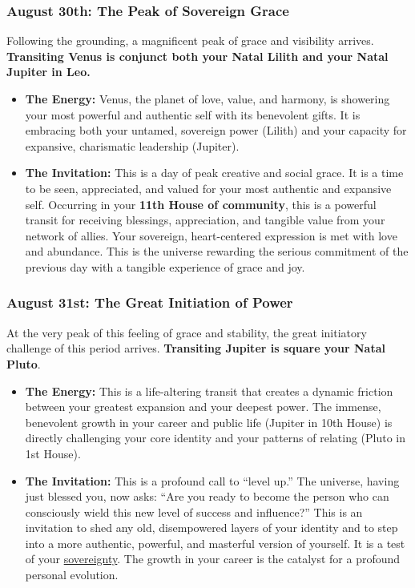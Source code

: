 \documentclass{article}
\begin{document}
\subsubsection*{August 30th: The Peak of Sovereign Grace}\label{august-30th-the-peak-of-sovereign-grace}

Following the grounding, a magnificent peak of grace and visibility arrives. \textbf{Transiting Venus is conjunct both your Natal Lilith and your Natal Jupiter in Leo.}

\begin{itemize}
\item
  \textbf{The Energy:} Venus, the planet of love, value, and harmony, is showering your most powerful and authentic self with its benevolent gifts. It is embracing both your untamed, sovereign power (Lilith) and your capacity for expansive, charismatic leadership (Jupiter).
\item
  \textbf{The Invitation:} This is a day of peak creative and social grace. It is a time to be seen, appreciated, and valued for your most authentic and expansive self. Occurring in your \textbf{11th House of community}, this is a powerful transit for receiving blessings, appreciation, and tangible value from your network of allies. Your sovereign, heart-centered expression is met with love and abundance. This is the universe rewarding the serious commitment of the previous day with a tangible experience of grace and joy.
\end{itemize}

\subsubsection*{August 31st: The Great Initiation of Power}\label{august-31st-the-great-initiation-of-power}

At the very peak of this feeling of grace and stability, the great initiatory challenge of this period arrives. \textbf{Transiting Jupiter is square your Natal Pluto}.

\begin{itemize}
\item
  \textbf{The Energy:} This is a life-altering transit that creates a dynamic friction between your greatest expansion and your deepest power. The immense, benevolent growth in your career and public life (Jupiter in 10th House) is directly challenging your core identity and your patterns of relating (Pluto in 1st House).
\item
  \textbf{The Invitation:} This is a profound call to ``level up.'' The universe, having just blessed you, now asks: ``Are you ready to become the person who can consciously wield this new level of success and influence?'' This is an invitation to shed any old, disempowered layers of your identity and to step into a more authentic, powerful, and masterful version of yourself. It is a test of your \hyperlink{gloss:sovereignty}{sovereignty}. The growth in your career is the catalyst for a profound personal evolution.
\end{itemize}
\end{document}
